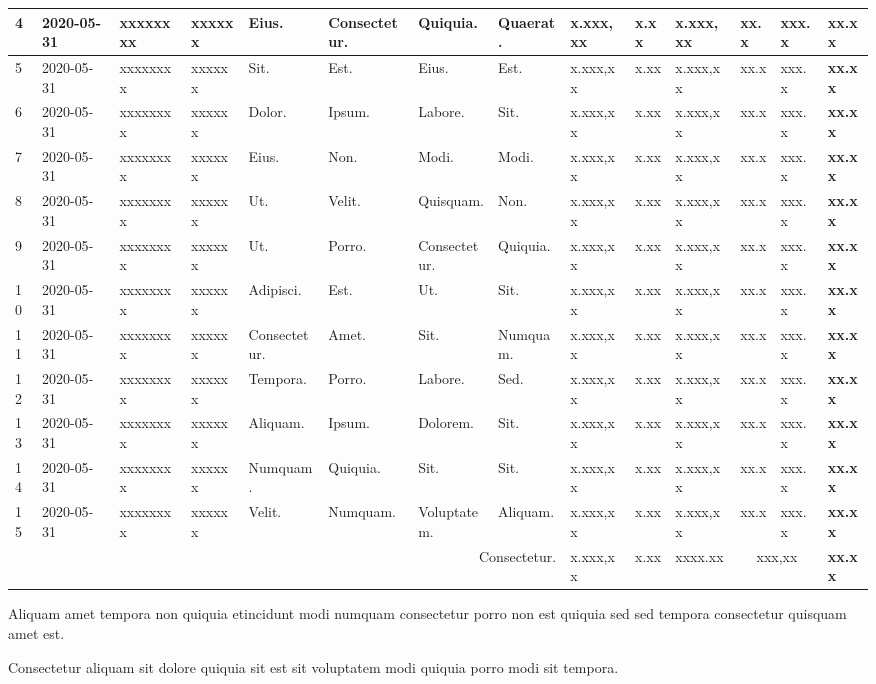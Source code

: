 \documentclass[a4paper,landscape]{article}%
\begin{document}
\begin{longtable}{|m{1cm}|m{1.7cm}|m{1.6cm}|m{1.9cm}|m{1.8cm}|m{1.8cm}|m{1.5cm}|m{1.6cm}|m{1.8cm}|m{1.6cm}|m{1.6cm}|m{1.2cm}|m{1.4cm}|m{1.4cm}|}
\hline%
4&2020{-}05{-}31&xxxxxxxx&xxxxxx&Eius.&Consectetur.&Quiquia.&Quaerat.&x.xxx,xx&x.xx&x.xxx,xx&xx.x&xxx.x&\textbf{xx.xx}\\%
\hline%
5&2020{-}05{-}31&xxxxxxxx&xxxxxx&Sit.&Est.&Eius.&Est.&x.xxx,xx&x.xx&x.xxx,xx&xx.x&xxx.x&\textbf{xx.xx}\\%
\hline%
6&2020{-}05{-}31&xxxxxxxx&xxxxxx&Dolor.&Ipsum.&Labore.&Sit.&x.xxx,xx&x.xx&x.xxx,xx&xx.x&xxx.x&\textbf{xx.xx}\\%
\hline%
7&2020{-}05{-}31&xxxxxxxx&xxxxxx&Eius.&Non.&Modi.&Modi.&x.xxx,xx&x.xx&x.xxx,xx&xx.x&xxx.x&\textbf{xx.xx}\\%
\hline%
8&2020{-}05{-}31&xxxxxxxx&xxxxxx&Ut.&Velit.&Quisquam.&Non.&x.xxx,xx&x.xx&x.xxx,xx&xx.x&xxx.x&\textbf{xx.xx}\\%
\hline%
9&2020{-}05{-}31&xxxxxxxx&xxxxxx&Ut.&Porro.&Consectetur.&Quiquia.&x.xxx,xx&x.xx&x.xxx,xx&xx.x&xxx.x&\textbf{xx.xx}\\%
\hline%
10&2020{-}05{-}31&xxxxxxxx&xxxxxx&Adipisci.&Est.&Ut.&Sit.&x.xxx,xx&x.xx&x.xxx,xx&xx.x&xxx.x&\textbf{xx.xx}\\%
\hline%
11&2020{-}05{-}31&xxxxxxxx&xxxxxx&Consectetur.&Amet.&Sit.&Numquam.&x.xxx,xx&x.xx&x.xxx,xx&xx.x&xxx.x&\textbf{xx.xx}\\%
\hline%
12&2020{-}05{-}31&xxxxxxxx&xxxxxx&Tempora.&Porro.&Labore.&Sed.&x.xxx,xx&x.xx&x.xxx,xx&xx.x&xxx.x&\textbf{xx.xx}\\%
\hline%
13&2020{-}05{-}31&xxxxxxxx&xxxxxx&Aliquam.&Ipsum.&Dolorem.&Sit.&x.xxx,xx&x.xx&x.xxx,xx&xx.x&xxx.x&\textbf{xx.xx}\\%
\hline%
14&2020{-}05{-}31&xxxxxxxx&xxxxxx&Numquam.&Quiquia.&Sit.&Sit.&x.xxx,xx&x.xx&x.xxx,xx&xx.x&xxx.x&\textbf{xx.xx}\\%
\hline%
15&2020{-}05{-}31&xxxxxxxx&xxxxxx&Velit.&Numquam.&Voluptatem.&Aliquam.&x.xxx,xx&x.xx&x.xxx,xx&xx.x&xxx.x&\textbf{xx.xx}\\%
\hline%
\multicolumn{8}{|r|}{Consectetur.}&x.xxx,xx&x.xx&xxxx.xx&\multicolumn{2}{c|}{xxx,xx}&\textbf{xx.xx}\\%
\hline%
\end{longtable}%
\begin{center}%
\begin{footnotesize}%
Aliquam amet tempora non quiquia etincidunt modi numquam consectetur porro non est quiquia sed sed tempora consectetur quisquam amet est.%
\end{footnotesize}%
\linebreak%
\begin{footnotesize}%
Consectetur aliquam sit dolore quiquia sit est sit voluptatem modi quiquia porro modi sit tempora.%
\end{footnotesize}%
\linebreak%
\end{center}%
\end{document}

